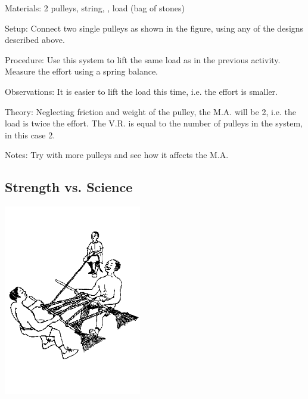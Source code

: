\begin{multicols}{2}
\begin{description*}
\item[Materials:]{2 pulleys, string, , load (bag of stones)}
\item[Setup:]{Connect two single pulleys as shown in the figure, using any of the designs described above.}
\item[Procedure:]{Use this system to lift the same load as in the previous activity. Measure the effort using a spring balance.}
\item[Observations:]{It is easier to lift the load this time, i.e. the effort is smaller.}
\item[Theory:]{Neglecting friction and weight of the pulley, the M.A. will be 2, i.e. the load is twice the effort. The V.R. is equal to the number of pulleys in the system, in this case 2.}
\item[Notes:]{Try with more pulleys and see how it affects the M.A.}
\end{description*}

\vfill
\columnbreak

\subsection{Strength vs. Science}

\begin{center}
\includegraphics[width=0.45\textwidth]{./img/source/pulley-strength.png}
\end{center}


\end{multicols}
